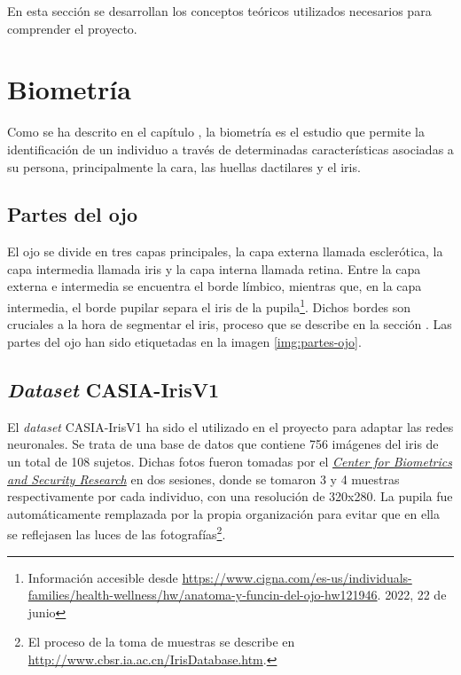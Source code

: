  \label{capitulo3}

En esta sección se desarrollan los conceptos teóricos utilizados necesarios para comprender el proyecto.

\section{Biometría}

Como se ha descrito en el capítulo , la biometría es el estudio que permite la identificación de un individuo a través de determinadas características asociadas a su persona, principalmente la cara, las huellas dactilares y el iris. 

\subsection{Partes del ojo} \label{partesojo} 

El ojo se divide en tres capas principales, la capa externa llamada esclerótica, la capa intermedia llamada iris y la capa interna llamada retina. Entre la capa externa e intermedia se encuentra el borde límbico, mientras que, en la capa intermedia, el borde pupilar separa el iris de la pupila\footnote{Información accesible desde \url{https://www.cigna.com/es-us/individuals-families/health-wellness/hw/anatoma-y-funcin-del-ojo-hw121946}. 2022, 22 de junio}.
Dichos bordes son cruciales a la hora de segmentar el iris, proceso que se describe en la sección .
Las partes del ojo han sido etiquetadas en la imagen \ref{img:partes-ojo}.


\subsection{\textit{Dataset} CASIA-IrisV1 }	\label{casia}

El \textit{dataset} CASIA-IrisV1 ha sido el utilizado en el proyecto para adaptar las redes neuronales. Se trata de una base de datos que contiene 756 imágenes del iris de un total de 108 sujetos. 
Dichas fotos fueron tomadas por el \href{http://www.cbsr.ia.ac.cn/english/index.asp}{\textit{Center for Biometrics and Security Research}} en dos sesiones, donde se tomaron 3 y 4 muestras respectivamente por cada individuo, con una resolución de 320x280. 
La pupila fue automáticamente remplazada por la propia organización para evitar que en ella se reflejasen las luces de las fotografías\footnote{El proceso de la toma de muestras se describe en \url{http://www.cbsr.ia.ac.cn/IrisDatabase.htm}.}.

